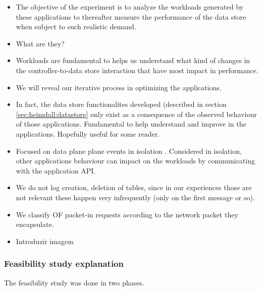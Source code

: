 \begin{itemize}
\item The objective of the experiment is to analyze the workloads generated by these applications to thereafter measure the performance of the data store when subject to such realistic demand.
\item What are they? 
\item Workloads are fundamental to helps us understand what kind of
  changes in the controller-to-data store interaction that have most
  impact in performance. 
\item We will reveal our iterative process in optimizing the
  applications.  %
\item In fact, the data store functionalites developed (described in
  section \ref{sec:heimdall:datastore} only exist as a consequence of
  the observed behaviour of those applications. Fundamental to help
  understand and improve in the applications. Hopefully useful for
  some reader. 

 \item Focused on data plane plane events in isolation . Considered in isolation,
 other applications behaviour can impact on the workloads  by
 communicating with the application API.
\item We do not log creation,
 deletion of tables, since in our experiences those are not relevant  these happen very
 infrequently (only on the first message or so). 
\item  We classify OF
packet-in requests according to the network packet they
encapsulate.
\item Introduzir imagem 
\end{itemize}



\subsubsection{Feasibility study explanation}


The feasibility study was done in two phases.

